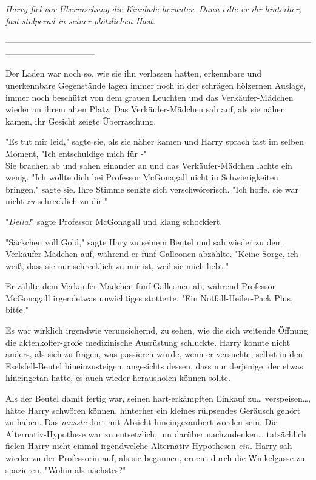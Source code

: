 {\emph{Harry fiel vor Überraschung die Kinnlade herunter. Dann eilte er ihr hinterher, fast stolpernd in seiner plötzlichen Hast.}

--------------------------------------------------------------------------------------------------------------------------------------------

Der Laden war noch so, wie sie ihn verlassen hatten, erkennbare und unerkennbare Gegenstände lagen immer noch in der schrägen hölzernen Auslage, immer noch beschützt von dem grauen Leuchten und das Verkäufer-Mädchen wieder an ihrem alten Platz. Das Verkäufer-Mädchen sah auf, als sie näher kamen, ihr Gesicht zeigte Überraschung.

"Es tut mir leid," sagte sie, als sie näher kamen und Harry sprach fast im selben Moment, "Ich entschuldige mich für -"\\ Sie brachen ab und sahen einander an und das Verkäufer-Mädchen lachte ein wenig. "Ich wollte dich bei Professor McGonagall nicht in Schwierigkeiten bringen," sagte sie. Ihre Stimme senkte sich verschwörerisch. "Ich hoffe, sie war nicht \emph{zu} schrecklich zu dir."

"\emph{Della!}" sagte Professor McGonagall und klang schockiert.

"Säckchen voll Gold," sagte Hary zu seinem Beutel und sah wieder zu dem Verkäufer-Mädchen auf, während er fünf Galleonen abzählte. "Keine Sorge, ich weiß, dass sie nur schrecklich zu mir ist, weil sie mich liebt."

Er zählte dem Verkäufer-Mädchen fünf Galleonen ab, während Professor McGonagall irgendetwas unwichtiges stotterte. "Ein Notfall-Heiler-Pack Plus, bitte."

Es war wirklich irgendwie verunsichernd, zu sehen, wie die sich weitende Öffnung die aktenkoffer-große medizinische Ausrüstung schluckte. Harry konnte nicht anders, als sich zu fragen, was passieren würde, wenn er versuchte, selbst in den Eselsfell-Beutel hineinzusteigen, angesichts dessen, dass nur derjenige, der etwas hineingetan hatte, es auch wieder herausholen können sollte.

Als der Beutel damit fertig war, seinen hart-erkämpften Einkauf zu… verspeisen…, hätte Harry schwören können, hinterher ein kleines rülpsendes Geräusch gehört zu haben. Das \emph{musste} dort mit Absicht hineingezaubert worden sein. Die Alternativ-Hypothese war zu entsetzlich, um darüber nachzudenken… tatsächlich fielen Harry nicht einmal irgendwelche Alternativ-Hypothesen \emph{ein.} Harry sah wieder zu der Professorin auf, als sie begannen, erneut durch die Winkelgasse zu spazieren. "Wohin als nächstes?"

}
